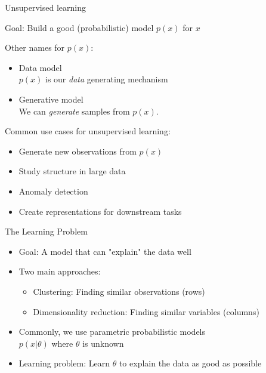 \documentclass[10pt]{beamer}
\begin{document}
\begin{frame}{Unsupervised learning}

{\color{uured} Goal}: Build a good (probabilistic) model $p(x)$ for $x$

\pause

Other names for $p(x)$:
\begin{itemize}
\item {\color{uured} Data} model\\ $p(x)$ is our \emph{data} generating mechanism
\item {\color{uured} Generative} model\\ We can \emph{generate} samples from $p(x)$.
\end{itemize}
\pause
Common use cases for unsupervised learning:
\begin{itemize}
\item Generate new observations from $p(x)$ %
\item Study structure in large data %
\item Anomaly detection %
\item Create representations for downstream tasks %
\end{itemize}

\end{frame}


\begin{frame}{The Learning Problem}

\begin{itemize}
\item {\color{uured} Goal}: A model that can "explain" the data well
\item Two main approaches:
\begin{itemize}
\item {\color{uured} Clustering}: Finding similar {\color{uured} observations} (rows)
\item {\color{uured} Dimensionality reduction}: Finding similar {\color{uured} variables} (columns)
\end{itemize}
\pause
\item Commonly, we use parametric probabilistic models\\ $p(x|\theta)$ where $\theta$ is unknown
\item {\color{uured} Learning problem}: Learn $\theta$ to explain the data as good as possible
\end{itemize}

\end{frame}
\end{document}
